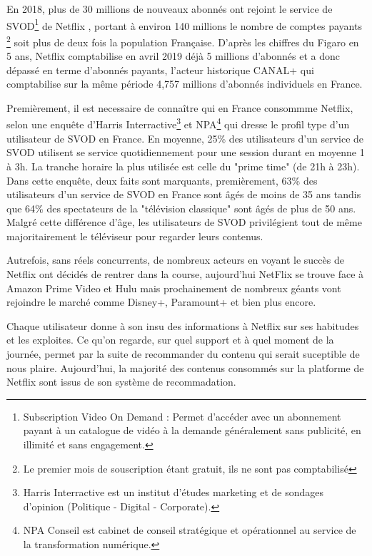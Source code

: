 En 2018, plus de 30 millions de nouveaux abonnés ont rejoint le service de SVOD\footnote{Subscription Video On Demand : Permet d'accéder avec un abonnement payant à un catalogue de vidéo à la demande généralement sans publicité, en illimité et sans engagement.} de Netflix , portant à environ 140 millions le nombre de comptes payants \footnote{Le premier mois de souscription étant gratuit, ils ne sont pas comptabilisé} soit plus de deux fois la population Française. D'après les chiffres du Figaro \supercite{FigaroChiffre} en 5 ans, Netflix comptabilise en avril 2019 déjà 5 millions d'abonnés et a donc dépassé en terme d'abonnés payants,  l'acteur historique CANAL+ qui comptabilise sur la même période 4,757 millions d'abonnés individuels en France. 

\vspace{5mm}

Premièrement, il est necessaire de connaître qui en France consommme Netflix, selon une enquête d'Harris Interractive\footnote{Harris Interractive est un institut d'études marketing et de sondages d'opinion (Politique - Digital - Corporate).}
et NPA\footnote{NPA Conseil est cabinet de conseil stratégique et opérationnel au service de la transformation numérique.} qui dresse le profil type d'un utilisateur de SVOD en France\supercite{NPA}. En moyenne,  25\% des utilisateurs d'un service de SVOD utilisent se service quotidiennement pour une session durant en moyenne 1 à 3h. La tranche horaire la plus utilisée est celle du "prime time" (de 21h à 23h). Dans cette enquête, deux faits sont marquants, premièrement, 63\% des utilisateurs d'un service de SVOD en France sont  âgés de moins de 35 ans tandis que 64\% des spectateurs de la "télévision classique" sont âgés de plus de 50 ans. Malgré cette différence d'âge, les utilisateurs de SVOD privilégient tout de même majoritairement le téléviseur pour regarder leurs contenus.


\vspace{5mm}


Autrefois, sans réels concurrents, \supercite{NetflixNumerama} de nombreux acteurs en voyant le succès de Netflix ont décidés de rentrer dans la course, aujourd'hui NetFlix se trouve face à Amazon Prime Video et Hulu mais prochainement de nombreux géants vont rejoindre le marché comme Disney+, Paramount+ et bien plus encore. 

\vspace{5mm}






Chaque utilisateur donne à son insu des informations à Netflix sur ses habitudes et les exploites. Ce qu'on regarde, sur quel support et à quel moment de la journée, permet par la suite de recommander du contenu qui serait suceptible de nous plaire. Aujourd'hui, la majorité des contenus consommés sur la platforme de Netflix sont issus de son système de recommadation. 
